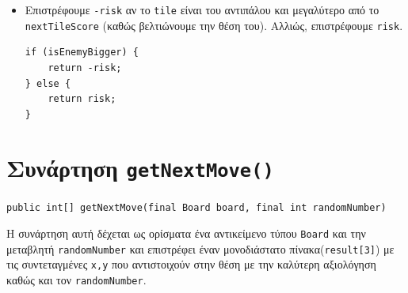 \begin{itemize}
\item Επιστρέφουμε \lstinline!-risk! αν το \lstinline!tile! είναι του αντιπάλου και μεγαλύτερο από το
\lstinline!nextTileScore! (καθώς βελτιώνουμε την θέση του).
Αλλιώς, επιστρέφουμε \lstinline!risk!.
\begin{lstlisting}[numbers=none, aboveskip=\smallskipamount, belowskip=\smallskipamount, captionpos=none]
if (isEnemyBigger) {
    return -risk;
} else {
    return risk;
}
\end{lstlisting}
\end{itemize}


\section{Συνάρτηση \texttt{getNextMove()}}
\begin{lstlisting}[numbers=none, title={Declaration της συνάρτησης}]
public int[] getNextMove(final Board board, final int randomNumber)
\end{lstlisting}
Η συνάρτηση αυτή δέχεται ως ορίσματα ένα αντικείμενο τύπου \lstinline!Board! και 
την μεταβλητή \lstinline!randomNumber! και επιστρέφει έναν 
μονοδιάστατο πίνακα(\lstinline!result[3]!) με τις συντεταγμένες \lstinline!x,y! 
που αντιστοιχούν στην θέση με την καλύτερη αξιολόγηση καθώς και τον 
\lstinline!randomNumber!.

